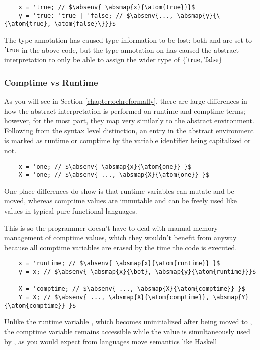 \documentclass[12pt,twoside]{report}
\begin{document}
\begin{listing}[H]
  \begin{verbatim}
    x = 'true; // $\absenv{ \absmap{x}{\atom{true}}}$
    y = 'true: 'true | 'false; // $\absenv{..., \absmap{y}{\{\atom{true}, \atom{false}\}}}$
  \end{verbatim}
  \caption{The type annotation has caused type information to be lost: both  and  are set to $\atom{true}$ in the above code, but the type annotation on  has caused the abstract interpretation to only be able to assign the wider type of $\{ \atom{true}, \atom{false} \}$}
\end{listing}

\subsubsection{Comptime vs Runtime}
As you will see in Section \ref{chapter:ochreformally}, there are large differences in how the abstract interpretation is performed on runtime and comptime terms; however, for the most part, they map very similarly to the abstract environment. Following from the syntax level distinction, an entry in the abstract environment is marked as runtime or comptime by the variable identifier being capitalized or not.

\begin{listing}[H]
  \begin{verbatim}
    x = 'one; // $\absenv{ \absmap{x}{\atom{one}} }$
    X = 'one; // $\absenv{ ..., \absmap{X}{\atom{one}} }$
  \end{verbatim}
\end{listing}

One place differences do show is that runtime variables can mutate and be moved, whereas comptime values are immutable and can be freely used like values in typical pure functional languages.

This is so the programmer doesn't have to deal with manual memory management of comptime values, which they wouldn't benefit from anyway because all comptime variables are erased by the time the code is executed.

\begin{listing}[H]
  \begin{verbatim}
    x = 'runtime; // $\absenv{ \absmap{x}{\atom{runtime}} }$
    y = x; // $\absenv{ \absmap{x}{\bot}, \absmap{y}{\atom{runtime}}}$
  
    X = 'comptime; // $\absenv{ ..., \absmap{X}{\atom{comptime}} }$
    Y = X; // $\absenv{ ..., \absmap{X}{\atom{comptime}}, \absmap{Y}{\atom{comptime}} }$
  \end{verbatim}
  \caption{Unlike the runtime variable , which becomes uninitialized after being moved to , the comptime variable  remains accessible while the value is simultaneously used by , as you would expect from languages move semantics like Haskell}
\end{listing}
\end{document}
